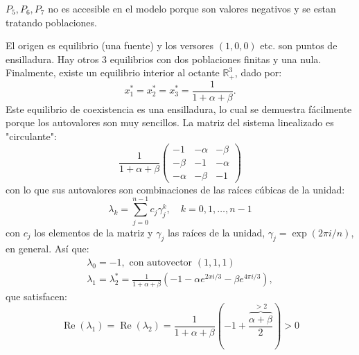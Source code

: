 \documentclass[twocolumn,aps,prl]{revtex4-1}
\newcommand{\talf}{\frac{\alpha - 1}{\alpha \beta - 1} }
\newcommand{\tbet}{\frac{\beta  - 1}{\alpha \beta - 1} }
\begin{document}



$P_5, P_6, P_7$ no es accesible en el modelo porque son valores negativos y se estan tratando poblaciones.

El origen es equilibrio (una fuente) y los versores $(1,0,0)$ etc. son puntos de ensilladura. Hay otros 3 equilibrios con dos poblaciones finitas y una nula. Finalmente, existe un equilibrio interior al octante $\mathbb{R}_{+}^{3}$, dado por:
$$
x_{1}^{*}=x_{2}^{*}=x_{3}^{*}=\frac{1}{1+\alpha+\beta} .
$$
Este equilibrio de coexistencia es una ensilladura, lo cual se demuestra fácilmente porque los autovalores son muy sencillos. La matriz del sistema linealizado es "circulante":
$$
\frac{1}{1+\alpha+\beta}\left(\begin{array}{ccc}
-1 & -\alpha & -\beta \\
-\beta & -1 & -\alpha \\
-\alpha & -\beta & -1
\end{array}\right)
$$
con lo que sus autovalores son combinaciones de las raíces cúbicas de la unidad:
$$
\lambda_{k}=\sum_{j=0}^{n-1} c_{j} \gamma_{j}^{k}, \quad k=0,1, \ldots, n-1
$$
con $c_{j}$ los elementos de la matriz y $\gamma_{j}$ las raíces de la unidad, $\gamma_{j}=\exp (2 \pi i / n)$, en general. Así que:
$$
\begin{array}{c}
\lambda_{0}=-1, \text { con autovector }(1,1,1) \\
\lambda_{1}=\lambda_{2}^{*}=\frac{1}{1+\alpha+\beta}\left(-1-\alpha e^{2 x i / 3}-\beta e^{4 \pi i / 3}\right),
\end{array}
$$
que satisfacen:
$$
\operatorname{Re}\left(\lambda_{1}\right)=\operatorname{Re}\left(\lambda_{2}\right)=\frac{1}{1+\alpha+\beta}\left(-1+\frac{\overbrace{\alpha+\beta}^{>2}}{2}\right)>0
$$
\end{document}
